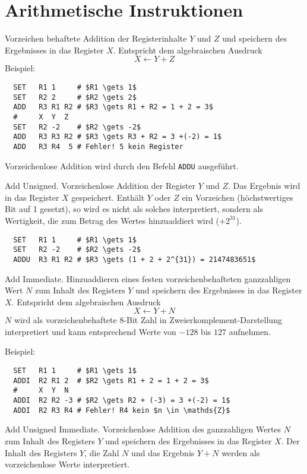 \section{Arithmetische Instruktionen} 

Vorzeichen behaftete Addition der Registerinhalte $Y$ und $Z$ und
speichern des Ergebnisses in das Register $X$. Entspricht dem algebraischen
Ausdruck
\[
    X \gets Y + Z
\]
Beispiel:
\begin{lstlisting}
  SET   R1 1     # $R1 \gets 1$
  SET   R2 2     # $R2 \gets 2$
  ADD   R3 R1 R2 # $R3 \gets R1 + R2 = 1 + 2 = 3$
  #     X  Y  Z
  SET   R2 -2    # $R2 \gets -2$
  ADD   R3 R3 R2 # $R3 \gets R3 + R2 = 3 +(-2) = 1$
  ADD   R3 R4  5 # Fehler! 5 kein Register
\end{lstlisting}
Vorzeichenlose Addition wird durch den Befehl \texttt{ADDU} ausgeführt.


\glqq Add Unsigned\grqq.
Vorzeichenlose Addition der Register $Y$ und $Z$. Das Ergebnis wird in das
Register $X$ gespeichert. Enthält $Y$ oder $Z$ ein Vorzeichen (höchstwertiges
Bit auf 1 gesetzt), so wird es nicht als solches interpretiert, sondern als
Wertigkeit, die zum Betrag des Wertes hinzuaddiert wird ($+2^{31}$).

\begin{lstlisting}
  SET   R1 1     # $R1 \gets 1$
  SET   R2 -2    # $R2 \gets -2$
  ADDU  R3 R1 R2 # $R3 \gets (1 + 2 + 2^{31}) = 2147483651$
\end{lstlisting}



\glqq Add Immediate\grqq.
Hinzuaddieren eines festen vorzeichenbehafteten ganzzahligen Wert $N$ zum Inhalt
des Registers $Y$ und speichern des Ergebnisses in das Register $X$.
Entspricht dem algebraischen Ausdruck
\[
  X \gets Y + N
\]
$N$ wird als vorzeichenbehaftete 8-Bit Zahl in Zweierkomplement-Darstellung
interpretiert und kann entsprechend Werte von $-128$ bis $127$ aufnehmen.

Beispiel:
\begin{lstlisting}
  SET   R1 1     # $R1 \gets 1$
  ADDI  R2 R1 2  # $R2 \gets R1 + 2 = 1 + 2 = 3$
  #     X  Y  N
  ADDI  R2 R2 -3 # $R2 \gets R2 + (-3) = 3 +(-2) = 1$
  ADDI  R2 R3 R4 # Fehler! R4 kein $n \in \mathds{Z}$
\end{lstlisting}



\glqq Add Unsigned Immediate\grqq.
Vorzeichenlose Addition des ganzzahligen Wertes $N$ zum Inhalt des Registers $Y$
und speichern des Ergebnisses in das Register $X$.
Der Inhalt des Registers $Y$, die Zahl $N$ und das Ergebnis $Y + N$ werden als
vorzeichenlose Werte interpretiert.



